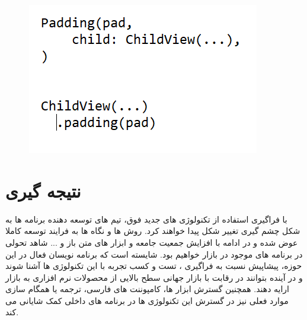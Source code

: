 \documentclass{CSICC2020}
\begin{document}
\begin{figure}[h!]
\centering\includegraphics[width=\linewidth]{Images/ext}
\caption{}
\label{fig:extension}
\end{figure}


\section{نتیجه گیری}
با فراگیری استفاده از تکنولوژی های جدید فوق، تیم های توسعه دهنده برنامه ها به شکل چشم گیری تغییر شکل پیدا خواهند کرد. روش ها و نگاه ها به فرایند توسعه کاملا عوض شده و در ادامه با افزایش جمعیت جامعه و ابزار های متن باز و ... شاهد تحولی در برنامه های موجود در بازار خواهیم بود.
شایسته است که برنامه نویسان فعال در این حوزه، پیشاپیش نسبت به فراگیری ، تست و کسب تجربه با این تکنولوژی ها آشنا شوند و در آینده بتوانند در رقابت با بازار جهانی سطح بالایی از محصولات نرم افزاری به بازار ارایه دهند.
همچنین گسترش ابزار ها، کامپوننت های فارسی، ترجمه یا همگام سازی موارد فعلی نیز در گسترش این تکنولوژی ها در برنامه های داخلی کمک شایانی می کند.



\end{document}
